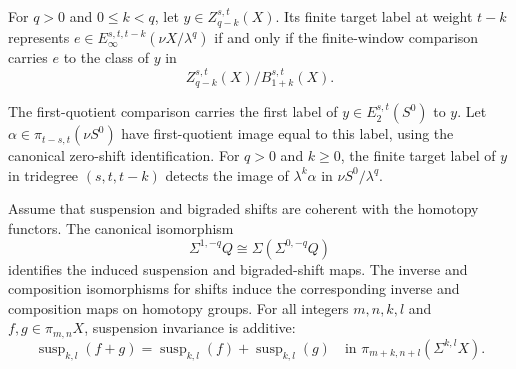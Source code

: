 \begin{theorem}
\label{sem:ProofTools:finite-target-label}
For $q>0$ and $0\leq k<q$, let $y\in Z_{q-k}^{s,t}(X)$. Its finite target label at weight $t-k$ represents $e\in E_\infty^{s,t,t-k}(\nu X/\lambda^q)$ if and only if the finite-window comparison carries $e$ to the class of $y$ in
\[Z_{q-k}^{s,t}(X)/B_{1+k}^{s,t}(X).\]
\end{theorem}

\begin{theorem}
\label{sem:ProofTools:sphere-label-detection}
The first-quotient comparison carries the first label of $y\in E_2^{s,t}(S^0)$ to $y$. Let $\alpha\in\pi_{t-s,t}(\nu S^0)$ have first-quotient image equal to this label, using the canonical zero-shift identification. For $q>0$ and $k\geq0$, the finite target label of $y$ in tridegree $(s,t,t-k)$ detects the image of $\lambda^k\alpha$ in $\nu S^0/\lambda^q$.
\end{theorem}

\begin{theorem}
\label{sem:ProofTools:shift-coherence}
Assume that suspension and bigraded shifts are coherent with the homotopy functors. The canonical isomorphism
\[\Sigma^{1,-q}Q\cong\Sigma(\Sigma^{0,-q}Q)\]
identifies the induced suspension and bigraded-shift maps. The inverse and composition isomorphisms for shifts induce the corresponding inverse and composition maps on homotopy groups.
For all integers $m,n,k,l$ and $f,g\in\pi_{m,n}X$, suspension invariance is additive:
\[
\operatorname{susp}_{k,l}(f+g)=\operatorname{susp}_{k,l}(f)+\operatorname{susp}_{k,l}(g)
\quad\text{in }\pi_{m+k,n+l}(\Sigma^{k,l}X).
\]
\end{theorem}

